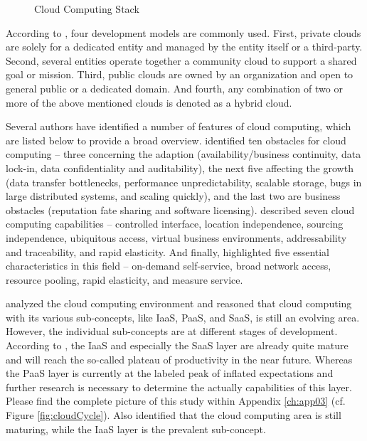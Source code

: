 \begin{figure}[htb]
	\centering
	
	\caption{Cloud Computing Stack}
	\label{fig:ccs}
\end{figure}

According to \citet[p. 3]{Mell2011}, four development models are commonly used. First, private clouds are solely for a dedicated entity and managed by the entity itself or a third-party. Second, several entities operate together a community cloud to support a shared goal or mission. Third, public clouds are owned by an organization and open to general public or a dedicated domain. And fourth, any combination of two or more of the above mentioned clouds is denoted as a hybrid cloud.

Several authors have identified a number of features of cloud computing, which are listed below to provide a broad overview. \citet[pp. 54-58]{Armbrust2010} identified ten obstacles for cloud computing -- three concerning the adaption (availability/business continuity, data lock-in, data confidentiality and auditability), the next five affecting the growth (data transfer bottlenecks, performance unpredictability, scalable storage, bugs in large distributed systems, and scaling quickly), and the last two are business obstacles (reputation fate sharing and software licensing). \citet[pp. 120-127]{Iyer2010} described seven cloud computing capabilities -- controlled interface, location independence, sourcing independence, ubiquitous access, virtual business environments, addressability and traceability, and rapid elasticity. And finally, \citet[p. 2]{Mell2011} highlighted five essential characteristics in this field -- on-demand self-service, broad network access, resource pooling, rapid elasticity, and measure service. 

\citet{Smith2012} analyzed the cloud computing environment and reasoned that cloud computing with its various sub-concepts, like \ac{IaaS}, \ac{PaaS}, and \ac{SaaS}, is still an evolving area. However, the individual sub-concepts are at different stages of development. According to \citet[p. 5]{Smith2012}, the \ac{IaaS} and especially the \ac{SaaS} layer are already quite mature and will reach the so-called plateau of productivity in the near future. Whereas the \ac{PaaS} layer is currently at the labeled peak of inflated expectations and further research is necessary to determine the actually capabilities of this layer. Please find the complete picture of this study within Appendix \ref{ch:app03} (cf. Figure \ref{fig:cloudCycle}). Also \citet[p. 120]{Iyer2010} identified that the cloud computing area is still maturing, while the \ac{IaaS} layer is the prevalent sub-concept.

